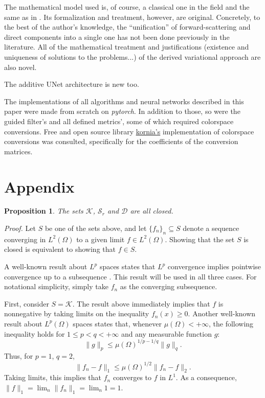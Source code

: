 \documentclass[twocolumn,twoside,a4paper,10pt]{IEEEtran}
\newtheorem{proposition}{Proposition}
\begin{document}
The mathematical model used is, of course, a classical one in the field and the same as in \cite{xie2021variational}. Its formalization and treatment, however, are original. Concretely, to the best of the author's knowledge, the ``unification'' of forward-scattering and direct components into a single one has
not been done previously in the literature. All of the mathematical treatment
and justifications (existence and uniqueness of solutions to the problems...) of
the derived variational approach are also novel.

The additive UNet architecture is new too.

The implementations of all algorithms and neural networks described in this
paper were made from scratch on \textit{pytorch}. In
addition to those, so were the guided filter's and all defined metrics', some of which required colorspace conversions. Free and open
source library \href{https://github.com/kornia/kornia}{kornia's} implementation
of colorspace conversions was consulted, specifically for the coefficients of
the conversion matrices.

\section{Appendix}

\begin{proposition}\label{prop:closed-sets}
  The sets \(\mathcal{K}\), \(\mathcal{S}_r\) and \(\mathcal{D}\) are all closed.
\end{proposition}
\textit{Proof.}
Let \(S\) be one of the sets above, and let \(\{f_n\}_n\subseteq S\) denote a sequence converging in \(L^2(\Omega)\) to a given limit \(f\in L^2(\Omega)\). Showing that the set \(S\) is closed is equivalent to showing that \(f\in S\).

A well-known result about \(L^p\) spaces states that \(L^p\) convergence implies pointwise convergence up to a subsequence \cite{ash1972real}. This result will be used in all three cases. For notational simplicity, simply take \(f_n\) as the converging subsequence.

First, consider \(S=\mathcal{K}\). The result above immediately implies that \(f\) is nonnegative by taking limits on the inequality \(f_n(x) \geq 0\). Another well-known result about \(L^p(\Omega)\) spaces states that, whenever \(\mu(\Omega)<+\infty\), the following inequality holds for \(1\leq p < q < +\infty\) and any measurable function \(g\):
\[
  \|g\|_p \leq \mu(\Omega)^{1/p - 1/q} \|g\|_q
.\]
Thus, for \(p=1\), \(q=2\),
\[
  \|f_n-f\|_1 \leq \mu(\Omega)^{1/2}\|f_n - f\|_2
.\]
Taking limits, this implies that \(f_n\) converges to \(f\) in \(L^1\). As a consequence, \(\|f\|_{1}=\lim_n \|f_n\|_{1}=\lim_n 1 = 1\).
\end{document}
